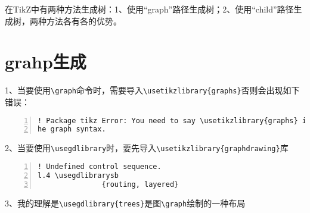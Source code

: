 在TikZ中有两种方法生成树：1、使用“graph”路径生成树；2、使用“child”路径生成树，两种方法各有各的优势。
\section{grahp生成}
	1、当要使用\verb"\graph"命令时，需要导入\verb"\usetikzlibrary{graphs}"否则会出现如下错误：
	\begin{lstlisting}[basicstyle=\footnotesize\ttfamily,numbers=left,numberstyle=\tiny, numbersep=9pt, frame=single]
! Package tikz Error: You need to say \usetikzlibrary{graphs} in order to use t
he graph syntax.
	\end{lstlisting}

	2、当要使用\verb"\usegdlibrary"时，要先导入\verb"\usetikzlibrary{graphdrawing}"库

	\begin{lstlisting}[basicstyle=\footnotesize\ttfamily,numbers=left,numberstyle=\tiny, numbersep=9pt, frame=single]
! Undefined control sequence.
l.4 \usegdlibrarysb
               {routing, layered}
	\end{lstlisting}
	
	3、我的理解是\verb"\usegdlibrary{trees}"是图\verb"\graph"绘制的一种布局